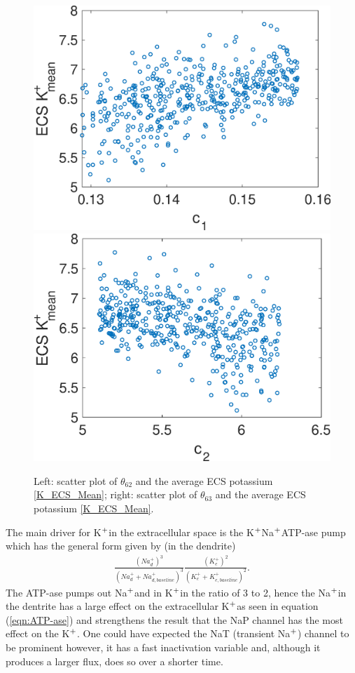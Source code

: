 \documentclass[smallextended]{svjour3}
\numberwithin{equation}{section}
\newcommand{\na}{Na$^{\text{\scriptsize +}}$}
\newcommand{\pot}{K$^{\text{\scriptsize +}}$}
\begin{document}
\begin{figure}
\centering
\includegraphics[width=0.49\linewidth]{Figures/Scatter_62_K_ECS}
\includegraphics[width=0.48\linewidth]{Figures/Scatter_63_K_ECS}
\caption{Left: scatter plot of $\theta_{62}$ and the average ECS potassium \eqref{K_ECS_Mean}; right: scatter plot of $\theta_{63}$ and the average ECS potassium \eqref{K_ECS_Mean}.}
\label{fig:scatter}
\end{figure}
The main driver for \pot in the extracellular space is the \pot \na ATP-ase pump which has the general form given by (in the dendrite)  
\begin{eqnarray}\label{eqn:ATP-ase}
\frac{(Na^{+}_{d})^3}{\left( Na^{+}_{d}+Na^{+}_{d,baseline}\right)^3}\frac{(K^{+}_e)^{2}}{\left( K^+_e +K^+_{e,baseline}\right) ^2}.
\end{eqnarray}
The ATP-ase pumps out \na and in \pot in the ratio of 3 to 2, hence the \na in the dentrite has a large effect on the extracellular \pot as seen in equation (\ref{eqn:ATP-ase}) and strengthens the result that the NaP channel has the most effect on the \pot. One could have expected the NaT (transient \na) channel to be prominent however, it has a fast inactivation variable and, although it produces a larger flux, does so over a shorter time.  
\end{document}
